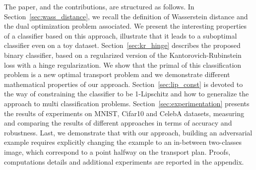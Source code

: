 The paper, and the contributions, are structured as follows. In Section~\ref{sec:wass_distance}, we recall the definition of Wasserstein distance and the dual optimization problem associated. We present the interesting properties of a classifier based on this approach, illustrate that it leads to a suboptimal classifier even on a toy dataset. Section~\ref{sec:kr_hinge} describes the proposed binary classifier, based on a regularized version of the Kantorovich-Rubinstein loss with a hinge regularization. We show that the primal of this classification problem is a new optimal transport problem and we demonstrate different mathematical properties of our approach. Section~\ref{sec:lip_const} is devoted to the way of constraining the classifier to be  1-Lipschitz and how to generalize the approach to multi classification problems. Section~\ref{sec:experimentation} presents the results of  experiments on MNIST, Cifar10 and CelebA datasets, measuring and comparing the results of different approaches in terms of accuracy and robustness. Last, we demonstrate that with our approach, building an adversarial example requires explicitly changing the example to an in-between two-classes image, which correspond to a point halfway on the transport plan. Proofs, computations details and additional experiments are reported in the appendix. 
